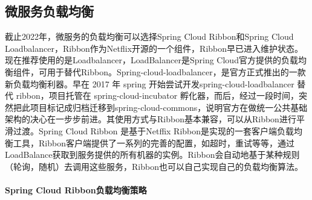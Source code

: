 \documentclass[../../../interview-questions.tex]{subfiles}
\begin{document}
\subsection{微服务负载均衡}

截止2022年，微服务的负载均衡可以选择Spring Cloud Ribbon和Spring Cloud Loadbalancer，Ribbon作为Netflix开源的一个组件，Ribbon早已进入维护状态。现在推荐使用的是Loadbalancer，LoadBalancer是Spring Cloud官方提供的负载均衡组件，可用于替代Ribbon。Spring-cloud-loadbalancer，是官方正式推出的一款新负载均衡利器。早在 2017 年 spring 开始尝试开发spring-cloud-loadbalancer 替代 ribbon，项目托管在 spring-cloud-incubator 孵化器，而后，经过一段时间，突然把此项目标记成归档迁移到spring-cloud-commons，说明官方在做统一公共基础架构的决心在一步步前进。其使用方式与Ribbon基本兼容，可以从Ribbon进行平滑过渡。Spring Cloud Ribbon 是基于​​Netffix Ribbon​​​是实现的一套客户端负载均衡工具，Ribbon客户端提供了一系列的完善的配置，如超时，重试等等，通过​​LoadBalance​​​获取到服务提供的所有机器的实例。Ribbon会自动地基于某种规则​​（轮询，随机）​​ 去调用这些服务，Ribbon也可以自己实现自己的负载均衡算法。

\paragraph{Spring Cloud Ribbon负载均衡策略}
\end{document}
